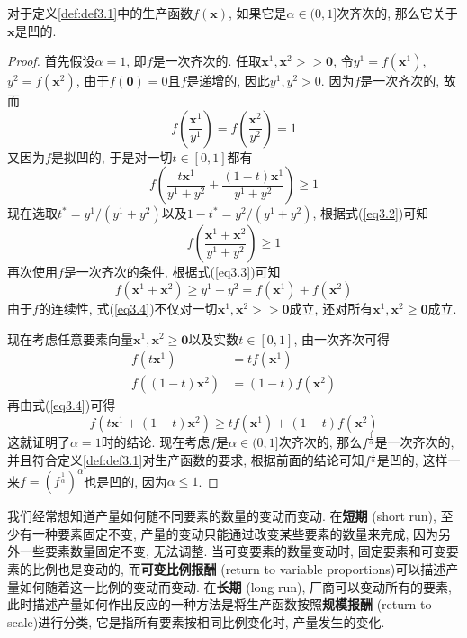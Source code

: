 \documentclass[cn, 12pt, math=mtpro2, bibstyle=apa, blue]{elegantbook}
\newcommand{\x}{\mathbf{x}}
\begin{document}
\begin{theorem}
  对于定义\ref{def:def3.1}中的生产函数$f(\x)$, 如果它是$\alpha\in (0,1]$次齐次的, 那么它关于$\x$是凹的.
\end{theorem}
\begin{proof}
  首先假设$\alpha=1$, 即$f$是一次齐次的. 任取$\x^1,\x^2>>\mathbf{0}$, 令$y^1=f(\x^1)$, $y^2=f(\x^2)$, 由于$f(\mathbf{0})=0$且$f$是递增的, 因此$y^1,y^2>0$. 因为$f$是一次齐次的, 故而
  $$f\left(\frac{\x^1}{y^1}\right)=f\left(\frac{\x^2}{y^2}\right)=1$$
  又因为$f$是拟凹的, 于是对一切$t\in[0,1]$都有
  \begin{equation}\label{eq3.2}
    f\left(\frac{t\x^1}{y^1+y^2}+\frac{(1-t)\x^1}{y^1+y^2}\right)\geq1
  \end{equation}
  现在选取$t^\ast=y^1/(y^1+y^2)$以及$1-t^\ast=y^2/(y^1+y^2)$, 根据式(\ref{eq3.2})可知
  \begin{equation}\label{eq3.3}
    f\left(\frac{\x^1+\x^2}{y^1+y^2}\right)\ge1
  \end{equation}
  再次使用$f$是一次齐次的条件, 根据式(\ref{eq3.3})可知
  \begin{equation}\label{eq3.4}
    f(\x^1+\x^2)\geq y^1+y^2=f(\x^1)+f(\x^2)
  \end{equation}
  由于$f$的连续性, 式(\ref{eq3.4})不仅对一切$\x^1,\x^2>>\mathbf{0}$成立, 还对所有$\x^1,\x^2\ge\mathbf{0}$成立.
  
  现在考虑任意要素向量$\x^1,\x^2\ge\mathbf{0}$以及实数$t\in[0,1]$, 由一次齐次可得
  \begin{align*}
  f(t\x^1)&=tf(\x^1) \\
  f((1-t)\x^2)&=(1-t)f(\x^2)
  \end{align*} 
  再由式(\ref{eq3.4})可得
  $$f(t\x^1+(1-t)\x^2)\geq tf(\x^1)+(1-t)f(\x^2)$$
  这就证明了$\alpha=1$时的结论. 现在考虑$f$是$\alpha\in (0,1]$次齐次的, 那么$f^{\frac{1}{\alpha}}$是一次齐次的, 并且符合定义\ref{def:def3.1}对生产函数的要求, 根据前面的结论可知$f^{\frac{1}{\alpha}}$是凹的, 这样一来$f=(f^{\frac{1}{\alpha}})^\alpha$也是凹的, 因为$\alpha\leq1$.
\end{proof}

我们经常想知道产量如何随不同要素的数量的变动而变动. 在\textbf{短期} (short run), 至少有一种要素固定不变, 产量的变动只能通过改变某些要素的数量来完成, 因为另外一些要素数量固定不变, 无法调整. 当可变要素的数量变动时, 固定要素和可变要素的比例也是变动的, 而\textbf{可变比例报酬} (return to variable proportions)可以描述产量如何随着这一比例的变动而变动. 在\textbf{长期} (long run), 厂商可以变动所有的要素, 此时描述产量如何作出反应的一种方法是将生产函数按照\textbf{规模报酬} (return to scale)进行分类, 它是指所有要素按相同比例变化时, 产量发生的变化.
\end{document}
